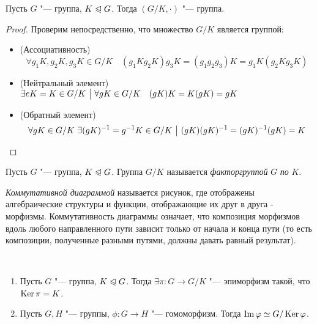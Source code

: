\begin{proposition}
	Пусть $G$ "--- группа, $K \trianglelefteqslant G$. Тогда $(G / K, \cdot)$ "--- группа.
\end{proposition}

\begin{proof}
	Проверим непосредственно, что множество $G / K$ является группой:
	\begin{itemize}
		\item (Ассоциативность) \[
			\forall g_1K, g_2K, g_3K \in G / K \quad (g_1Kg_2K)g_3K = (g_1g_2g_3)K = g_1K(g_2Kg_3K)
		\]
		\item (Нейтральный элемент) \(
			\exists eK = K \in G / K \ \big|\  \forall gK \in G / K \quad (gK)K = K(gK) = gK
		\)
		\item (Обратный элемент) \[
			\forall gK \in G / K\ \exists (gK)^{-1} = g^{-1}K \in G / K \such (gK)(gK)^{-1} \hm= (gK)^{-1}(gK) = K
		\]
	\end{itemize}
\end{proof}

\begin{definition}
	Пусть $G$ "--- группа, $K \trianglelefteqslant G$. Группа $G / K$ называется \textit{факторгруппой} $G$ \textit{по} $K$.
\end{definition}

\begin{definition}
	\textit{Коммутативной диаграммой} называется рисунок, где отображены алгебраические структуры и функции, отображающие их друг в друга - морфизмы. Коммутативность диаграммы означает, что композиция морфизмов вдоль любого направленного пути зависит только от начала и конца пути (то есть композиции, полученные разными путями, должны давать равный результат).
\end{definition}

\begin{theorem}~
	\begin{enumerate}
		\item Пусть $G$ "--- группа, $K \trianglelefteqslant G$. Тогда $\exists \pi: G \to G / K$ "--- эпиморфизм такой, что $\ke\pi \hm= K$.
		\item Пусть $G, H$ "--- группы, $\phi: G \to H$ "--- гомоморфизм. Тогда $\operatorname{Im} \varphi \simeq G / \operatorname{Ker} \varphi$.
	\end{enumerate}
\end{theorem}

